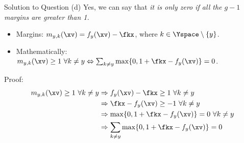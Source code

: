 \documentclass[aspectratio=169]{beamer}
\newcommand{\fyx}{f_y(\xv)}
\begin{document}
\begin{frame}{Solution to Question (d)}
	Yes, we can say that \emph{it is only zero if all the $g-1$ margins are greater than 1.}
	\begin{itemize}
		\item Margins: $m_{y, k}(\xv) = \fyx - \fkx$, where $k \in \Yspace \setminus \{y\}$.
		\item Mathematically: $ m_{y, k}(\xv) \geq 1 \ \forall k \neq y  \Leftrightarrow \sum_{k \neq y} \max \{0, 1 + \fkx - \fyx \} = 0$.
	\end{itemize}
	
	\vspace{10pt}
	
	Proof: 
	\begin{align*}
		m_{y, k}(\xv) \geq 1 \ \forall k \neq y  
		&\Rightarrow \fyx - \fkx  \geq 1 \ \forall k \neq y \\
		&\Rightarrow \fkx - \fyx \geq -1 \ \forall k \neq y \\
		&\Rightarrow \max \{0, 1 + \fkx - \fyx \} = 0 \ \forall k \neq y \\
		&\Rightarrow \sum_{k \neq y} \max \{0, 1 + \fkx - \fyx \} = 0
	\end{align*}
	
\end{frame}
\end{document}
